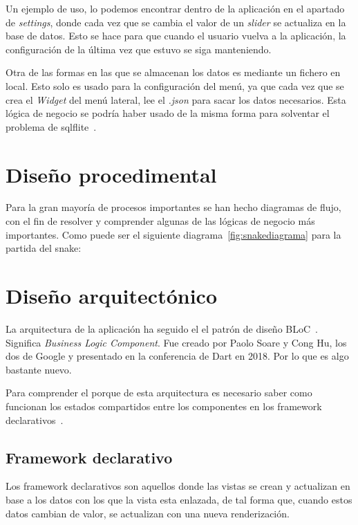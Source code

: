\begin{itemize}
	Un ejemplo de uso, lo podemos encontrar dentro de la aplicación en el apartado de \emph{settings}, donde cada vez que se cambia el valor de un \emph{slider} se actualiza en la base de datos. Esto se hace para que cuando el usuario vuelva a la aplicación, la configuración de la última vez que estuvo se siga manteniendo.
	
\end{itemize}

Otra de las formas en las que se almacenan los datos es mediante un fichero en local. Esto solo es usado para la configuración del menú, ya que cada vez que se crea el \emph{Widget} del menú lateral, lee el \emph{.json} para sacar los datos necesarios. Esta lógica de negocio se podría haber usado de la misma forma para solventar el problema de sqlflite~\pageref{sqlflite}.

\section{Diseño procedimental}
Para la gran mayoría de procesos importantes se han hecho diagramas de flujo, con el fin de resolver y comprender algunas de las lógicas de negocio más importantes. Como puede ser el siguiente diagrama~\ref{fig:snakediagrama} para la partida del snake:


\section{Diseño arquitectónico}
La arquitectura de la aplicación ha seguido el el patrón de diseño BLoC~\cite{xurxodev:bloc}. Significa \emph{Business Logic Component}. Fue creado por Paolo Soare y Cong Hu, los dos de Google y presentado en la conferencia de Dart en 2018. Por lo que es algo bastante nuevo.

Para comprender el porque de esta arquitectura es necesario saber como funcionan los estados compartidos entre los componentes en los framework declarativos~\pageref{declarativo}.

\subsection{Framework declarativo}\label{declarativo}
Los framework declarativos son aquellos donde las vistas se crean y actualizan en base a los datos con los que la vista esta enlazada, de tal forma que, cuando estos datos cambian de valor, se actualizan con una nueva renderización.


